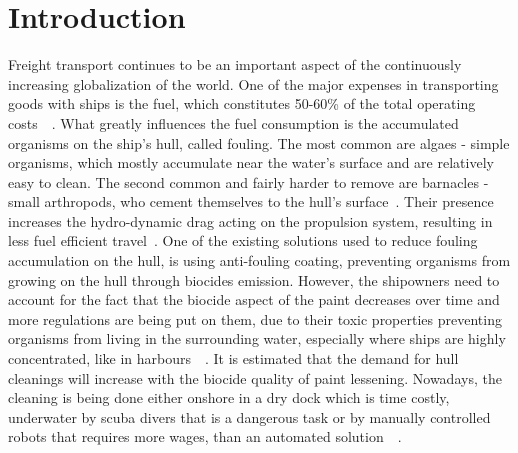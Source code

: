 \section{Introduction} 

Freight transport continues to be an important aspect of the continuously increasing globalization of the world. One of the major expenses in transporting goods with ships is the fuel, which constitutes 50-60\% of the total operating costs~\cite{fuel-costs}~\cite{energy_vision}.
What greatly influences the fuel consumption is the accumulated organisms on the ship's hull, called fouling. The most common are algaes - simple organisms, which mostly accumulate near the water's surface and are relatively easy to clean. The second common and fairly harder to remove are barnacles - small arthropods, who cement themselves to the hull's surface~\cite{BarnacleGlue}. Their presence increases the hydro-dynamic drag acting on the propulsion system, resulting in less fuel efficient travel~\cite{FoulingPrevention}. One of the existing solutions used to reduce fouling accumulation on the hull, is using anti-fouling coating\cite{AntiFoulingCoating}, preventing organisms from growing on the hull through biocides emission. However, the shipowners need to account for the fact that the biocide aspect of the paint decreases over time and more regulations are being put on them, due to their toxic properties preventing organisms from living in the surrounding water, especially where ships are highly concentrated, like in harbours~\cite{badAntifouling}~\cite{badAntifouling2}. It is estimated that the demand for hull cleanings will increase with the biocide quality of paint lessening. Nowadays, the cleaning is being done either onshore in a dry dock which is time costly, underwater by scuba divers that is a dangerous task or by manually controlled robots that requires more wages, than an automated solution~\cite{divers}~\cite{keelkrab}.




